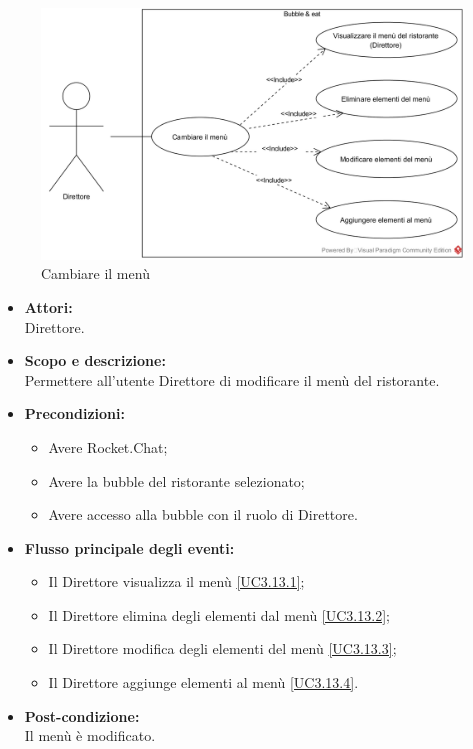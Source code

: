 
\begin{figure}[H]
	\centering
	\includegraphics[width=15cm]{../../documenti/AnalisiDeiRequisiti/Diagrammi_img/uc3_13.png}
	\caption{\UCCaption{} Cambiare il menù}
\end{figure}

\begin{itemize}
	\item \textbf{Attori:}
	\\Direttore.
	\item \textbf{Scopo e descrizione:} 
	\\Permettere all'utente Direttore di modificare il menù del ristorante.
	\item \textbf{Precondizioni:}
	\begin{itemize}
		\item Avere Rocket.Chat;
		\item Avere la bubble del ristorante selezionato;
		\item Avere accesso alla bubble con il ruolo di Direttore.
	\end{itemize}
	\item \textbf{Flusso principale degli eventi:}
	\begin{itemize}
		\item Il Direttore visualizza il menù \ref{UC3.13.1};
		\item Il Direttore elimina degli elementi dal menù \ref{UC3.13.2};
		\item Il Direttore modifica degli elementi del menù \ref{UC3.13.3};
		\item Il Direttore aggiunge elementi al menù \ref{UC3.13.4}.
	\end{itemize}
	\item \textbf{Post-condizione:}
	\\Il menù è modificato.
\end{itemize}

